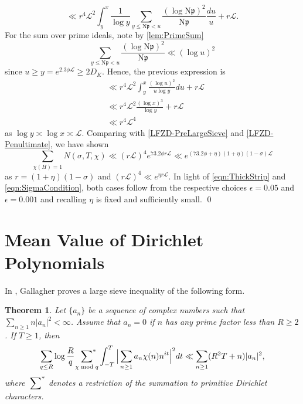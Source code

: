 \documentclass[12pt,psamsfonts]{amsart}
\newtheorem{thm}{Theorem}[section]
\theoremstyle{definition}
\theoremstyle{remark}
\numberwithin{equation}{section}
\theoremstyle{plain}
\theoremstyle{remark}
\renewcommand{\1}{ {\bf 1}}
\newcommand{\cL}{\mathcal{L}}
\newcommand{\N}{\mathrm{N}}
\newcommand{\kp}{\mathfrak{p}}
\begin{document}
\begin{equation}
\ll r^4 \cL^2 \int_y^x \frac{1}{\log y} \sum_{y \leq \N\kp < u} \frac{ (\log \N\kp)^2}{\N\kp} \frac{du}{u} + r\cL.
\label{LFZD-Penultimate}
\end{equation}
For the sum over prime ideals, note by \cref{lem:PrimeSum} 
\[
\sum_{y \leq \N\kp < u} \frac{ (\log \N\kp)^2}{\N\kp} \ll (\log u)^2
\]
since $u \geq y  = e^{2.3 \phi\cL} \geq 2D_K$.  Hence, the previous expression is 
\begin{align*}
& \ll r^4 \cL^2 \int_y^x \frac{(\log u)^2}{u \log y}du + r\cL \\
& \ll r^4 \cL^2 \frac{ (\log x)^3 }{\log y} + r\cL \\
& \ll r^4 \cL^4 
\end{align*}
as $\log y \asymp \log x \asymp \cL$. Comparing with \eqref{LFZD-PreLargeSieve} and \eqref{LFZD-Penultimate}, we have shown 
\[
\sum_{\chi(H) = 1} N(\sigma, T,\chi) \ll (r\cL)^4 e^{73.2 \phi r\cL} \ll e^{(73.2 \phi +\eta) (1+\eta) (1-\sigma) \cL} 
\]
as $r = (1+\eta)(1-\sigma)$ and $(r\cL)^4 \ll e^{\eta r\cL}$. In light of \eqref{eqn:ThickStrip} and \eqref{eqn:SigmaCondition}, both cases follow from the respective choices $\epsilon = 0.05$ and $\epsilon = 0.001$ and recalling $\eta$ is fixed and sufficiently small. \qed
\section{Mean Value of Dirichlet Polynomials}
\label{sec:MeanValue}

In \cite{Gallagher}, Gallagher proves a large sieve inequality of the following form.
\begin{thm}
\label{thm:Gallagher}
Let $\{a_n\}$ be a sequence of complex numbers such that $\sum_{n\geq 1}n|a_n|^2<\infty$.  Assume that $a_n=0$ if $n$ has any prime factor less than $R\geq2$.  If $T\geq 1$, then
\[
\sum_{q\leq R}\log\frac{R}{q}~\sideset{}{^*}\sum_{\chi\bmod q}\int_{-T}^{T}\Big|\sum_{n\geq 1}a_n\chi(n)n^{it}\Big|^2 dt\ll \sum_{n\geq 1}(R^2 T+n)|a_n|^2,
\]
where $\sideset{}{^*}\sum$ denotes a restriction of the summation to primitive Dirichlet characters.
\end{thm} 
\end{document}
